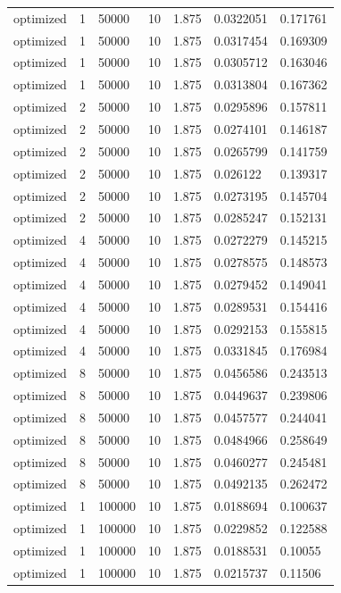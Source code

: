 \begin{table}[ht]
\begin{tabular}{lllllll}
optimized & 1 & 50000 & 10 & 1.875 & 0.0322051 & 0.171761 \\ 
optimized & 1 & 50000 & 10 & 1.875 & 0.0317454 & 0.169309 \\ 
optimized & 1 & 50000 & 10 & 1.875 & 0.0305712 & 0.163046 \\ 
optimized & 1 & 50000 & 10 & 1.875 & 0.0313804 & 0.167362 \\ 
optimized & 2 & 50000 & 10 & 1.875 & 0.0295896 & 0.157811 \\ 
optimized & 2 & 50000 & 10 & 1.875 & 0.0274101 & 0.146187 \\ 
optimized & 2 & 50000 & 10 & 1.875 & 0.0265799 & 0.141759 \\ 
optimized & 2 & 50000 & 10 & 1.875 & 0.026122 & 0.139317 \\ 
optimized & 2 & 50000 & 10 & 1.875 & 0.0273195 & 0.145704 \\ 
optimized & 2 & 50000 & 10 & 1.875 & 0.0285247 & 0.152131 \\ 
optimized & 4 & 50000 & 10 & 1.875 & 0.0272279 & 0.145215 \\ 
optimized & 4 & 50000 & 10 & 1.875 & 0.0278575 & 0.148573 \\ 
optimized & 4 & 50000 & 10 & 1.875 & 0.0279452 & 0.149041 \\ 
optimized & 4 & 50000 & 10 & 1.875 & 0.0289531 & 0.154416 \\ 
optimized & 4 & 50000 & 10 & 1.875 & 0.0292153 & 0.155815 \\ 
optimized & 4 & 50000 & 10 & 1.875 & 0.0331845 & 0.176984 \\ 
optimized & 8 & 50000 & 10 & 1.875 & 0.0456586 & 0.243513 \\ 
optimized & 8 & 50000 & 10 & 1.875 & 0.0449637 & 0.239806 \\ 
optimized & 8 & 50000 & 10 & 1.875 & 0.0457577 & 0.244041 \\ 
optimized & 8 & 50000 & 10 & 1.875 & 0.0484966 & 0.258649 \\ 
optimized & 8 & 50000 & 10 & 1.875 & 0.0460277 & 0.245481 \\ 
optimized & 8 & 50000 & 10 & 1.875 & 0.0492135 & 0.262472 \\ 
optimized & 1 & 100000 & 10 & 1.875 & 0.0188694 & 0.100637 \\ 
optimized & 1 & 100000 & 10 & 1.875 & 0.0229852 & 0.122588 \\ 
optimized & 1 & 100000 & 10 & 1.875 & 0.0188531 & 0.10055 \\ 
optimized & 1 & 100000 & 10 & 1.875 & 0.0215737 & 0.11506 \\ 

\end{tabular}
\end{table}
